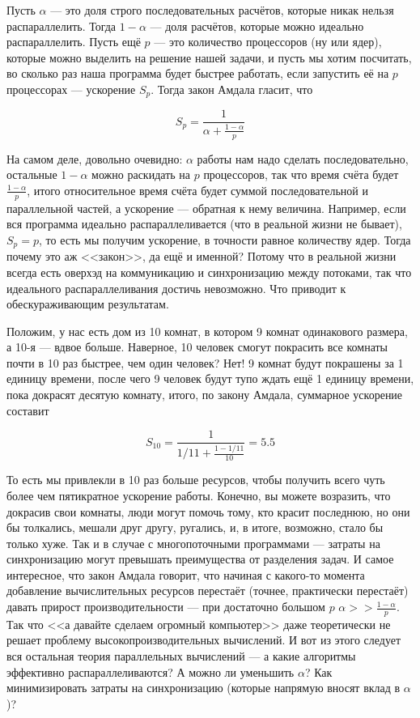 \documentclass{../../text-style}
\begin{document}
Пусть $\alpha$ --- это доля строго последовательных расчётов, которые никак нельзя распараллелить. Тогда $1 - \alpha$ --- доля расчётов, которые можно идеально распараллелить. Пусть ещё $p$ --- это количество процессоров (ну или ядер), которые можно выделить на решение нашей задачи, и пусть мы хотим посчитать, во сколько раз наша программа будет быстрее работать, если запустить её на $p$ процессорах --- ускорение $S_p$. Тогда закон Амдала гласит, что

$$S_p = \frac{1}{\alpha + \frac{1 - \alpha}{p}}$$

На самом деле, довольно очевидно: $\alpha$ работы нам надо сделать последовательно, остальные $1 - \alpha$ можно раскидать на $p$ процессоров, так что время счёта будет $\frac{1 - \alpha}{p}$, итого относительное время счёта будет суммой последовательной и параллельной частей, а ускорение --- обратная к нему величина. Например, если вся программа идеально распараллеливается (что в реальной жизни не бывает), $S_p = p$, то есть мы получим ускорение, в точности равное количеству ядер. Тогда почему это аж <<закон>>, да ещё и именной? Потому что в реальной жизни всегда есть оверхэд на коммуникацию и синхронизацию между потоками, так что идеального распараллеливания достичь невозможно. Что приводит к обескураживающим результатам.

Положим, у нас есть дом из 10 комнат, в котором 9 комнат одинакового размера, а 10-я --- вдвое больше. Наверное, 10 человек смогут покрасить все комнаты почти в 10 раз быстрее, чем один человек? Нет! 9 комнат будут покрашены за 1 единицу времени, после чего 9 человек будут тупо ждать ещё 1 единицу времени, пока докрасят десятую комнату, итого, по закону Амдала, суммарное ускорение составит

$$S_{10} = \frac{1}{1/11 + \frac{1 - 1/11}{10}} = 5.5$$

То есть мы привлекли в 10 раз больше ресурсов, чтобы получить всего чуть более чем пятикратное ускорение работы. Конечно, вы можете возразить, что докрасив свои комнаты, люди могут помочь тому, кто красит последнюю, но они бы толкались, мешали друг другу, ругались, и, в итоге, возможно, стало бы только хуже. Так и в случае с многопоточными программами --- затраты на синхронизацию могут превышать преимущества от разделения задач. И самое интересное, что закон Амдала говорит, что начиная с какого-то момента добавление вычислительных ресурсов перестаёт (точнее, практически перестаёт) давать прирост производительности --- при достаточно большом $p$ $\alpha >> \frac{1 - \alpha}{p}$. Так что <<а давайте сделаем огромный компьютер>> даже теоретически не решает проблему высокопроизводительных вычислений. И вот из этого следует вся остальная теория параллельных вычислений --- а какие алгоритмы эффективно распараллеливаются? А можно ли уменьшить $\alpha$? Как минимизировать затраты на синхронизацию (которые напрямую вносят вклад в $\alpha$)? 
\end{document}
